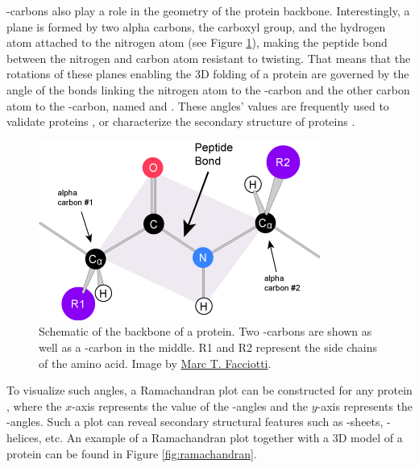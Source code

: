 \textalpha{}-carbons also play a role in the geometry of the protein backbone.
Interestingly, a plane is formed by two alpha carbons, the carboxyl group, and
the hydrogen atom attached to the nitrogen atom (see Figure \ref{fig:backbone}),
making the peptide bond between the nitrogen and carbon atom resistant to
twisting. That means that the rotations of these planes enabling the 3D folding
of a protein are governed by the angle of the bonds linking the nitrogen atom to
the \textalpha{}-carbon and the other carbon atom to the \textalpha{}-carbon,
named \textphi{} and \textpsi{}. These angles' values are frequently used to
validate proteins \citep{gore2017validation}, or characterize the secondary
structure of proteins \citep{wood2005protein}.


\begin{figure}[h]
  \centering
  \includegraphics[width=.6\textwidth]{./figures/peptide_bond.png}
  \caption[Schematic of the backbone of a protein.]{Schematic of the backbone of a protein. Two \textalpha{}-carbons are
    shown as well as a \textbeta{}-carbon in the middle. R1 and R2 represent the
    side chains of the amino acid. Image by
    \href{https://bio.libretexts.org/Under_Construction/Purgatory/Core_\%28Britt\%27s_page\%29/Proteins*\%23}{Marc
      T. Facciotti}.}
  \label{fig:backbone}
\end{figure}


To visualize such angles, a Ramachandran plot can be constructed for any protein
\citep{ramachandran1063Stereochemistry}, where the $x$-axis represents the value
of the \textphi{}-angles and the $y$-axis represents the \textpsi{}-angles. Such
a plot can reveal secondary structural features such as \textbeta{}-sheets,
\textalpha{}-helices, etc. An example of a Ramachandran plot together with a 3D model of
a protein can be found in Figure \ref{fig:ramachandran}.

